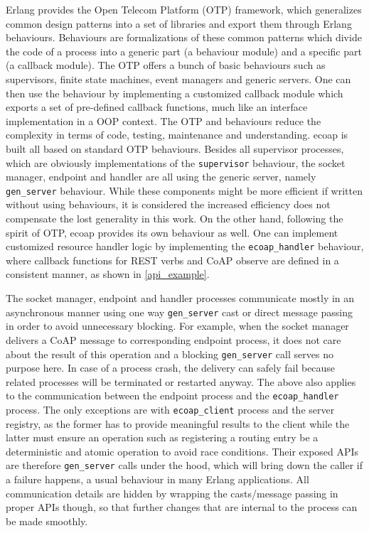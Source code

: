 Erlang provides the Open Telecom Platform (OTP) framework, which generalizes common design patterns into a set of libraries and export them through Erlang behaviours. Behaviours are formalizations of these common patterns which divide the code of a process into a generic part (a behaviour module) and a specific part (a callback module). The OTP offers a bunch of basic behaviours such as supervisors, finite state machines, event managers and generic servers. One can then use the behaviour by implementing a customized callback module which exports a set of pre-defined callback functions, much like an interface implementation in a OOP context. The OTP and behaviours reduce the complexity in terms of code, testing, maintenance and understanding. ecoap is built all based on standard OTP behaviours. Besides all supervisor processes, which are obviously implementations of the \verb|supervisor| behaviour, the socket manager, endpoint and handler are all using the generic server, namely \verb|gen_server| behaviour. While these components might be more efficient if written without using behaviours, it is considered the increased efficiency does not compensate the lost generality in this work. On the other hand, following the spirit of OTP, ecoap provides its own behaviour as well. One can implement customized resource handler logic by implementing the \verb|ecoap_handler| behaviour, where callback functions for REST verbs and CoAP observe are defined in a consistent manner, as shown in \autoref{api_example}.

The socket manager, endpoint and handler processes communicate mostly in an asynchronous manner using one way \verb|gen_server| cast or direct message passing in order to avoid unnecessary blocking. For example, when the socket manager delivers a CoAP message to corresponding endpoint process, it does not care about the result of this operation and a blocking \verb|gen_server| call serves no purpose here. In case of a process crash, the delivery can safely fail because related processes will be terminated or restarted anyway. The above also applies to the communication between the endpoint process and the \verb|ecoap_handler| process. The only exceptions are with \verb|ecoap_client| process and the server registry, as the former has to provide meaningful results to the client while the latter must ensure an operation such as registering a routing entry be a deterministic and atomic operation to avoid race conditions. Their exposed APIs are therefore \verb|gen_server| calls under the hood, which will bring down the caller if a failure happens, a usual behaviour in many Erlang applications. All communication details are hidden by wrapping the casts/message passing in proper APIs though, so that further changes that are internal to the process can be made smoothly. 

